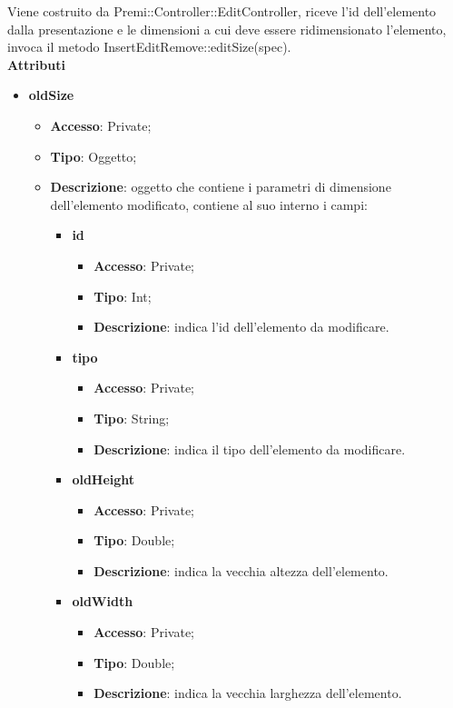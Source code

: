 {{{		\indent Viene costruito da Premi::Controller::EditController, riceve l’id dell’elemento dalla presentazione e le dimensioni a cui deve essere ridimensionato l’elemento, invoca il metodo InsertEditRemove::editSize(spec).\\
			\textbf{Attributi}
			\begin{itemize}
				\item \textbf{oldSize}
				\begin{itemize}
				\item \textbf{Accesso}: Private;
				\item \textbf{Tipo}: Oggetto;
				\item \textbf{Descrizione}: oggetto che contiene i parametri di dimensione dell'elemento modificato, contiene al suo interno i campi:
				\begin{itemize}
				\item \textbf{id}
				\begin{itemize}
					\item \textbf{Accesso}: Private;
					\item \textbf{Tipo}: Int;
					\item \textbf{Descrizione}: indica l'id dell’elemento da modificare.
				\end{itemize}
				\item \textbf{tipo}
				\begin{itemize}
					\item \textbf{Accesso}: Private;
					\item \textbf{Tipo}: String;
					\item \textbf{Descrizione}: indica il tipo dell’elemento da modificare.
				\end{itemize}
				\item \textbf{oldHeight}
				\begin{itemize}
					\item \textbf{Accesso}: Private;
					\item \textbf{Tipo}: Double;
					\item \textbf{Descrizione}: indica la vecchia altezza dell’elemento.
				\end{itemize}
				\item \textbf{oldWidth}
				\begin{itemize}
					\item \textbf{Accesso}: Private;
					\item \textbf{Tipo}: Double;
					\item \textbf{Descrizione}: indica la vecchia larghezza dell’elemento.

\end{itemize}
\end{itemize}
\end{itemize}
\end{itemize}}}}
